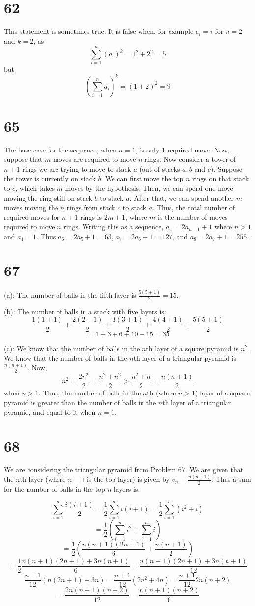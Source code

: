 \documentclass{article}
\theoremstyle{definition}
\newcommand{\?}{\stackrel{?}{=}}
\begin{document}
\section*{62}
This statement is sometimes true. It is false when, for example $a_i=i$ for $n=2$ and $k=2$, as
\[ \sum_{i=1}^n(a_i)^k=1^2+2^2=5 \] but \[ (\sum_{i=1}^na_i)^k=(1+2)^2=9 \]

\section*{65}
The base case for the sequence, when $n=1$, is only 1 required move. Now, suppose that $m$ moves are required to move $n$ rings. 
Now consider a tower of $n+1$ rings we are trying to move to stack $a$ (out of stacks $a,b$ and $c$). Suppose the tower is currently on stack $b$. 
We can first move the top $n$ rings on that stack to $c$, which takes $m$ moves by the hypothesis. Then, we can spend one move moving the ring still 
on stack $b$ to stack $a$. After that, we can spend another $m$ moves moving the $n$ rings from stack $c$ to stack $a$. Thus, the total number of required moves for 
$n+1$ rings is $2m+1$, where $m$ is the number of moves required to move $n$ rings. Writing this as a sequence, $a_n=2a_{n-1}+1$ where 
$n>1$ and $a_1=1$. Thus $a_6=2a_5+1=63$, $a_7=2a_6+1=127$, and $a_8=2a_7+1=255$.

\section*{67}
(a): The number of balls in the fifth layer is $\frac{5(5+1)}{2}=15$.


(b): The number of balls in a stack with five layers is:
\[ \frac{1(1+1)}{2}+\frac{2(2+1)}{2}+\frac{3(3+1)}{2}+\frac{4(4+1)}{2}+\frac{5(5+1)}{2} \]
\[ =1+3+6+10+15=35 \]


(c): We know that the number of balls in the $n$th layer of a square pyramid is $n^2$. We know that the number of balls in the 
$n$th layer of a triangular pyramid is $\frac{n(n+1)}{2}$. Now, \[ n^2=\frac{2n^2}{2}=\frac{n^2+n^2}{2}>\frac{n^2+n}{2}=\frac{n(n+1)}{2} \]
when $n>1$. Thus, the number of balls in the $n$th (where $n>1$) layer of a square pyramid is greater than the number of balls in the $n$th layer of a 
triangular pyramid, and equal to it when $n=1$.

\section*{68}
We are considering the triangular pyramid from Problem 67. We are given that the $n$th layer (where $n=1$ is the top layer) is given 
by $a_n=\frac{n(n+1)}{2}$. Thus a sum for the number of balls in the top $n$ layers is:
\begin{samepage}
\[ \sum_{i=1}^n\frac{i(i+1)}{2}=\frac{1}{2}\sum_{i=1}^ni(i+1)=\frac{1}{2}\sum_{i=1}^n(i^2+i)\]
\[ =\frac{1}{2}(\sum_{i=1}^ni^2+\sum_{i=1}^ni) \]
\[ =\frac{1}{2}(\frac{n(n+1)(2n+1)}{6}+\frac{n(n+1)}{2}) \]
\[ =\frac{1}{2}\frac{n(n+1)(2n+1)+3n(n+1)}{6}=\frac{n(n+1)(2n+1)+3n(n+1)}{12} \]
\[ \frac{n+1}{12}(n(2n+1)+3n)=\frac{n+1}{12}(2n^2+4n)=\frac{n+1}{12}2n(n+2) \]
\[ =\frac{2n(n+1)(n+2)}{12}=\frac{n(n+1)(n+2)}{6} \]
\end{samepage}
\end{document}
